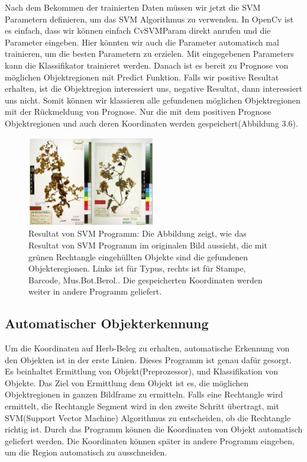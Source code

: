 \documentclass[10pt,a4paper]{report}
\begin{document}
Nach dem Bekommen der trainierten Daten müssen wir jetzt die SVM Parametern definieren, um das SVM Algorithmus zu verwenden. In OpenCv ist es einfach, dass wir können einfach CvSVMParam direkt anrufen und die Parameter eingeben. Hier könnten wir auch die Parameter automatisch mal trainieren, um die besten Parametern zu erzielen. 
Mit eingegebenen Parameters kann die Klassifikator trainieret werden. Danach ist es bereit zu Prognose von möglichen Objektregionen mit Predict Funktion. Falls wir positive Resultat erhalten, ist die Objektregion interessiert uns, negative Resultat, dann interessiert uns nicht. Somit können wir klassieren alle gefundenen möglichen Objektregionen mit der Rückmeldung von Prognose. Nur die mit dem positiven Prognose Objektregionen und auch deren Koordinaten werden gespeichert(Abbildung 3.6). \\
\begin{figure}[htbp] 
	\centering
	\includegraphics[width=0.5\textwidth]{Svmresult.png}
	\caption{Resultat von SVM Programm: Die Abbildung zeigt, wie das Resultat von SVM Programm im originalen Bild aussieht, die mit grünen Rechtangle eingehüllten Objekte sind die gefundenen Objekteregionen. Links ist für Typus, rechts ist für Stampe, Barcode, Mus.Bot.Berol.. Die gespeicherten Koordinaten werden weiter in andere Programm geliefert.
	}
	\label{fig:Bild 8}
\end{figure}

\subsection{Automatischer Objekterkennung}
Um die Koordinaten auf Herb-Beleg zu erhalten, automatische Erkennung von den Objekten ist in der erste Linien.  Dieses Programm ist genau dafür gesorgt. Es beinhaltet Ermittlung von Objekt(Preprozessor), und Klassifikation von Objekte.  Das Ziel von Ermittlung dem Objekt ist es, die möglichen Objektregionen in ganzen Bildframe zu ermitteln. Falls eine Rechtangle wird ermittelt, die Rechtangle Segment wird in den zweite Schritt übertragt, mit SVM(Support Vector Machine) Algorithmus zu entscheiden, ob die Rechtangle richtig ist. Durch das Programm können die Koordinaten von Objekt automatisch geliefert werden. Die Koordinaten können später in andere Programm eingeben, um die Region automatisch zu ausschneiden. 
\end{document}
